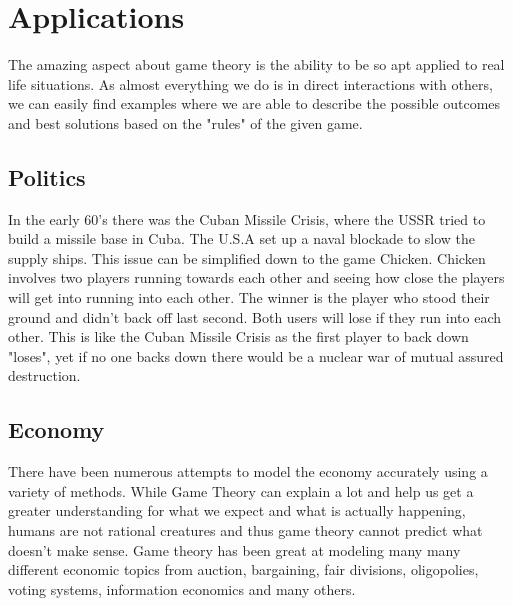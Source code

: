\documentclass[12pt]{article}
\begin{document}
 	\section{Applications}
 		The amazing aspect about game theory is the ability to be so apt applied to real life situations. As almost everything we do is in direct interactions with others, we can easily find examples where we are able to describe the possible outcomes and best solutions based on the "rules" of the given game.
 		\subsection{Politics}
 		In the early 60's there was the Cuban Missile Crisis, where the USSR tried to build a missile base in Cuba. The U.S.A set up a naval blockade to slow the supply ships. This issue can be simplified down to the game Chicken. Chicken involves two players running towards each other and seeing how close the players will get into running into each other. The winner is the player who stood their ground and didn't back off last second. Both users will lose if they run into each other. This is like the Cuban Missile Crisis as the first player to back down "loses", yet if no one backs down there would be a nuclear war of mutual assured destruction.
 		
 		\subsection{Economy}
 		There have been numerous attempts to model the economy accurately using a variety of methods. While Game Theory can explain a lot and help us get a greater understanding for what we expect and what is actually happening, humans are not rational creatures and thus game theory cannot predict what doesn't make sense. Game theory has been great at modeling many many different economic topics from auction, bargaining, fair divisions, oligopolies, voting systems, information economics and many others.
 	
\end{document}
